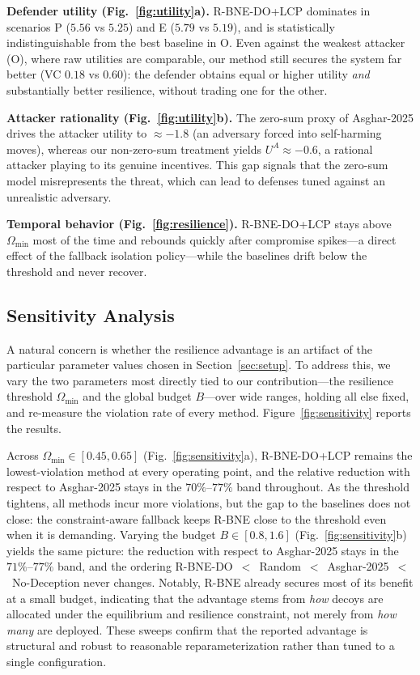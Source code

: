 \documentclass[conference]{IEEEtran}
\begin{document}
\textbf{Defender utility (Fig.~\ref{fig:utility}a).} R-BNE-DO+LCP dominates in
scenarios P ($5.56$ vs $5.25$) and E ($5.79$ vs $5.19$), and is statistically
indistinguishable from the best baseline in O. Even against the weakest attacker
(O), where raw utilities are comparable, our method still secures the system far
better (VC $0.18$ vs $0.60$): the defender obtains equal or higher utility
\emph{and} substantially better resilience, without trading one for the other.

\textbf{Attacker rationality (Fig.~\ref{fig:utility}b).} The zero-sum proxy of
Asghar-2025 drives the attacker utility to $\approx-1.8$ (an adversary forced
into self-harming moves), whereas our non-zero-sum treatment yields
$U^A\approx-0.6$, a rational attacker playing to its genuine incentives. This
gap signals that the zero-sum model misrepresents the threat, which can lead to
defenses tuned against an unrealistic adversary.

\textbf{Temporal behavior (Fig.~\ref{fig:resilience}).} R-BNE-DO+LCP stays above
$\Omega_{\min}$ most of the time and rebounds quickly after compromise
spikes---a direct effect of the fallback isolation policy---while the baselines
drift below the threshold and never recover.

\subsection{Sensitivity Analysis}

A natural concern is whether the resilience advantage is an artifact of the
particular parameter values chosen in Section~\ref{sec:setup}. To address this,
we vary the two parameters most directly tied to our contribution---the
resilience threshold $\Omega_{\min}$ and the global budget $B$---over wide
ranges, holding all else fixed, and re-measure the violation rate of every
method. Figure~\ref{fig:sensitivity} reports the results.

Across $\Omega_{\min}\in[0.45,0.65]$ (Fig.~\ref{fig:sensitivity}a),
R-BNE-DO+LCP remains the lowest-violation method at every operating point, and
the relative reduction with respect to Asghar-2025 stays in the
$70\%$--$77\%$ band throughout. As the threshold tightens, all methods
incur more violations, but the gap to the baselines does not close: the
constraint-aware fallback keeps R-BNE close to the threshold even when it is
demanding. Varying the budget $B\in[0.8,1.6]$ (Fig.~\ref{fig:sensitivity}b)
yields the same picture: the reduction with respect to Asghar-2025 stays in the
$71\%$--$77\%$ band, and the ordering
R-BNE-DO~$<$~Random~$<$~Asghar-2025~$<$~No-Deception never changes. Notably,
R-BNE already secures most of its benefit at a small budget, indicating that the
advantage stems from \emph{how} decoys are allocated under the equilibrium and
resilience constraint, not merely from \emph{how many} are deployed. These
sweeps confirm that the reported advantage is structural and robust to
reasonable reparameterization rather than tuned to a single configuration.
\end{document}

